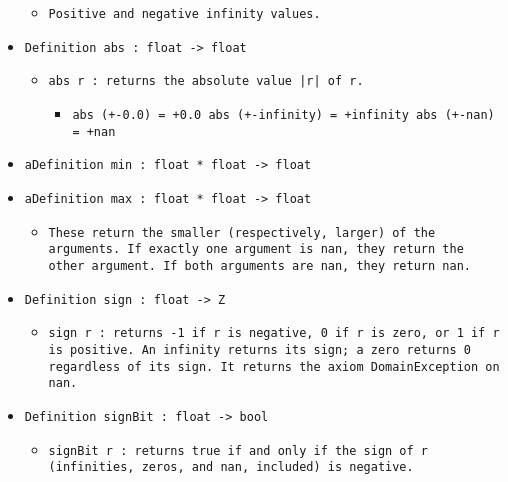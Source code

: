 \documentclass[11pt]{report}
\begin{document}
\begin{itemize}
\begin{itemize}
\item   \texttt{Positive and negative infinity values.}
\end{itemize}

\item  \texttt{Definition abs : float -> float} 

\begin{itemize}
\item  \texttt{abs r : returns the absolute value |r| of r.}

\begin{itemize}
\item  \texttt{abs (+-0.0) = +0.0 abs (+-infinity) = +infinity abs (+-nan) = +nan}
\end{itemize}

\end{itemize}

\item  \texttt{aDefinition min : float * float -> float}

\item  \texttt{aDefinition max : float * float -> float}

\begin{itemize}
\item  \begin{flushleft} \texttt{These return the smaller (respectively, larger) of the arguments. If exactly one argument is nan, they return the other argument. If both arguments are nan, they return nan.} \end{flushleft}
\end{itemize}

\item  \texttt{Definition sign : float -> Z}

\begin{itemize}
\item  \begin{flushleft} \texttt{sign r : returns -1 if r is negative, 0 if r is zero, or 1 if r is positive. An infinity returns its sign; a zero returns 0 regardless of its sign. It returns the axiom DomainException on nan.} \end{flushleft}
\end{itemize}

\item  \texttt{Definition signBit : float -> bool}

\begin{itemize}
\item  \begin{flushleft} \texttt{signBit r : returns true if and only if the sign of r (infinities, zeros, and nan, included) is negative.} \end{flushleft}


\end{itemize}
\end{itemize}
\end{document}
